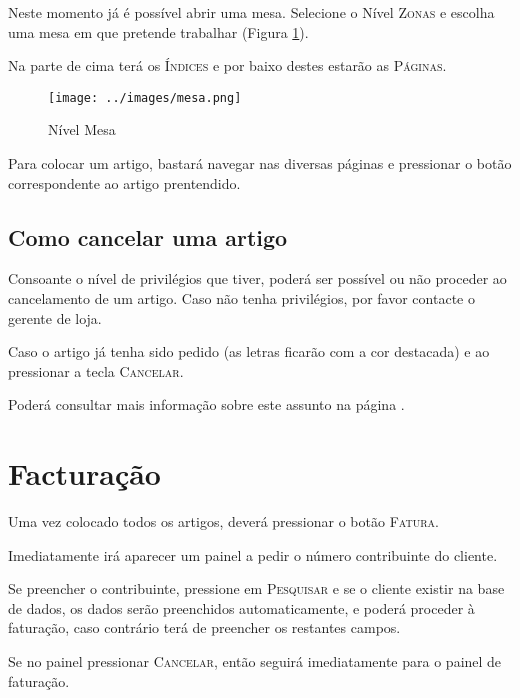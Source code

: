 \documentclass[a4paper,11pt,openany]{memoir}
\begin{document}
Neste momento já é possível abrir uma mesa. Selecione o Nível \textsc{Zonas} e escolha uma mesa em que pretende trabalhar (Figura \ref{nivelMesa}).

Na parte de cima terá os \textsc{Índices} e por baixo destes estarão as \textsc{Páginas}.


\begin{figure}
\begin{center}
\texttt{[image: ../images/mesa.png]}
\caption[Submanifold]{Nível Mesa}
\label{nivelMesa}
\end{center}
\end{figure}



Para colocar um artigo, bastará navegar nas diversas páginas e pressionar o botão correspondente ao artigo prentendido.

\subsection{Como cancelar uma artigo}

Consoante o nível de privilégios que tiver, poderá ser possível ou não proceder ao cancelamento de um artigo. Caso não tenha privilégios, por favor contacte o gerente de loja.

Caso o artigo já tenha sido pedido (as letras ficarão com a cor destacada) e ao pressionar a tecla \textsc{Cancelar}.



Poderá consultar mais informação sobre este assunto na página \pageref{VendaArtigos}.


\section{Facturação}


Uma vez colocado todos os artigos, deverá pressionar o botão \textsc{Fatura}. 

Imediatamente irá aparecer um painel a pedir o número contribuinte do cliente. 

Se preencher o contribuinte, pressione em \textsc{Pesquisar} e se o cliente existir na base de dados, os dados serão preenchidos automaticamente,
 e poderá proceder à faturação, caso contrário terá de preencher os restantes campos.

Se no painel pressionar \textsc{Cancelar}, então seguirá imediatamente para o painel de faturação.
\end{document}

